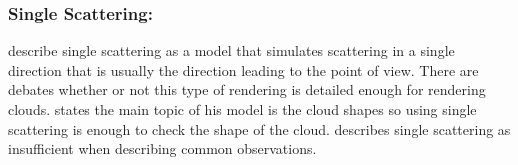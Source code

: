 \subsubsection{Single Scattering:}
\citet*{MHarris01} describe single scattering as a model that simulates scattering in a single direction that is usually the direction leading to the point of view.
There are debates whether or not this type of rendering is detailed enough for rendering clouds.
\citet{Miyazaki01} states the main topic of his model is the cloud shapes so using single scattering is enough to check the shape of the cloud.
\citet{CBohren87} describes single scattering as insufficient when describing common observations. 